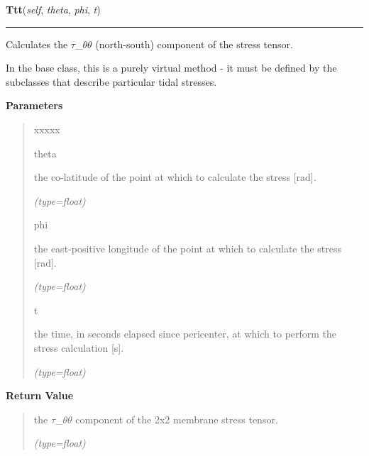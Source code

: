     \label{SatStress:SatStress:StressDef:Ttt}

    \vspace{0.5ex}

\hspace{.8\funcindent}\begin{boxedminipage}{\funcwidth}

    \raggedright \textbf{Ttt}(\textit{self}, \textit{theta}, \textit{phi}, \textit{t})

    \vspace{-1.5ex}

    \rule{\textwidth}{0.5\fboxrule}
\setlength{\parskip}{2ex}
    Calculates the \(\tau\)\_\(\theta\)\(\theta\) (north-south) component 
    of the stress tensor.

    In the base class, this is a purely virtual method - it must be defined
    by the subclasses that describe particular tidal stresses.

\setlength{\parskip}{1ex}
      \textbf{Parameters}
      \vspace{-1ex}

      \begin{quote}
        \begin{Ventry}{xxxxx}

          \item[theta]

          the co-latitude of the point at which to calculate the stress 
          [rad].

            {\it (type=float)}

          \item[phi]

          the east-positive longitude of the point at which to calculate 
          the stress [rad].

            {\it (type=float)}

          \item[t]

          the time, in seconds elapsed since pericenter, at which to 
          perform the stress calculation [s].

            {\it (type=float)}

        \end{Ventry}

      \end{quote}

      \textbf{Return Value}
    \vspace{-1ex}

      \begin{quote}
      the \(\tau\)\_\(\theta\)\(\theta\) component of the 2x2 membrane 
      stress tensor.

      {\it (type=float)}

      \end{quote}

    \end{boxedminipage}

